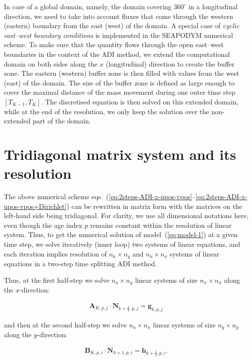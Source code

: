 \noindent In case of a global domain, namely, the domain covering $360^{\circ}$ in a longitudinal direction, we need to take into account fluxes that come through the western (eastern) boundary from the east (west) of the domain. A special case of \textit{cyclic east--west boundary conditions} is implemented in the SEAPODYM numerical scheme. To make sure that the quantity flows through the open east--west boundaries in the context of the ADI method, we extend the computational domain on both sides along the $x$ (longitudinal) direction to create the buffer zone. The eastern (western) buffer zone is then filled with values from the west (east) of the domain. The size of the buffer zone is defined as large enough to cover the maximal distance of the mass movement during one outer time step $[T_{K-1},T_K]$. The discretised equation is then solved on this extended domain, while at the end of the resolution, we only keep the solution over the non-extended part of the domain.

\section{Tridiagonal matrix system and its resolution} 

\noindent The above numerical scheme eqs.~(\ref{eq:2steps-ADI-x-upos-vpos}--\ref{eq:2steps-ADI-x-upos-vpos+Dirichlet}) can be rewritten in matrix form with the matrices on the left-hand side being tridiagonal. For clarity, we use all dimensional notations here, even though the age index $p$ remains constant within the resolution of linear system. Thus, to get the numerical solution of model~(\ref{eq:model-1}) at a given time step, we solve iteratively (inner loop) two systems of linear equations, and each iteration implies resolution of $n_a\times n_y$ and $n_a\times n_x$ systems of linear equations in a two-step time splitting ADI method. 

Thus, at the first half-step we solve $n_a\times n_y$ linear systems of size $n_x\times n_x$ along the $x$-direction:

\begin{align}
\label{eq:matrix-form-x}
 \mathbf{A}_{K,p,j} \cdot \mathbf{N}_{k+\frac{1}{2},p,j} = \mathbf{g}_{k,p,j}
\end{align}

\noindent and then at the second half-step we solve $n_a\times n_x$ linear systems of size $n_y\times n_y$ along the $y$-direction: 

\begin{align}
\label{eq:matrix-form-y}
 \mathbf{B}_{K,p,i} \cdot \mathbf{N}_{k+1,p,i} = \mathbf{h}_{k+\frac{1}{2},p,i}.
\end{align}   

